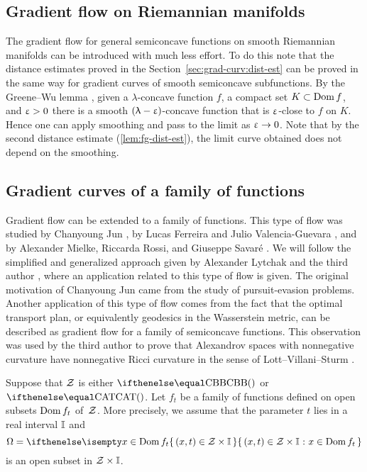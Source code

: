 \subsection*{Gradient flow on Riemannian manifolds}
The gradient flow for general semiconcave functions 
on smooth Riemannian manifolds  can be introduced with much less effort.
To do this note that the distance estimates proved in the Section~\ref{sec:grad-curv:dist-est}
can be proved in the same way for gradient curves of smooth semiconcave subfunctions.
By the Greene--Wu lemma \cite{greene-wu}, 
given 
a $\lambda$-concave function $f$, 
a compact set $K\subset \Dom f$,
and $\upvarepsilon>0$
there is a smooth $(\uplambda-\upvarepsilon)$-concave function that is 
$\upvarepsilon$-close to $f$ on $K$.
Hence one can apply smoothing and pass to the limit as $\eps\to0$.
Note that by the second distance  estimate (\ref{lem:fg-dist-est}), the  limit curve obtained does not depend on the smoothing.

\subsection*{Gradient curves of a family of functions}

Gradient flow can be extended to a family of functions.
This type of flow was studied by Chanyoung Jun \cite{jun-thesis,jun:grad}, by Lucas Ferreira and Julio Valencia-Guevara \cite{ferreira-valencia}, and by Alexander Mielke, Riccarda Rossi, and Giuseppe Savar\'{e} \cite{mielke-rossi-savare}.
We will follow the simplified and generalized approach given by Alexander Lytchak and the third author \cite{lytchak-petrunin-2020}, where an application related to this type of flow is given.
The original motivation of Chanyoung Jun came from the study of pursuit-evasion problems.
Another application of this type of flow comes from the fact that
 the optimal transport plan, or equivalently geodesics in the Wasserstein metric, can be described as gradient flow for a family of semiconcave functions.
This observation was used by the third author to prove that Alexandrov spaces with nonnegative curvature have nonnegative Ricci curvature in the sense of Lott--Villani--Sturm \cite{petrunin:optimal}.

Suppose that $\mathcal{Z}$ is either $\Alex{}$ or $\CAT{}$.
Let $f_t$ be a family of functions defined on open subsets $\mathop{\rm Dom}\nolimits f_t$ of~$\mathcal{Z}$.
More precisely, we assume that the parameter $t$ lies in a real interval $\mathbb{I}$ and 
\[\Omega=\set{(x,t)\in\spc{Z}\times \II}{x\in\Dom f_t}\]
is an open subset in $\spc{Z}\times \II$.

